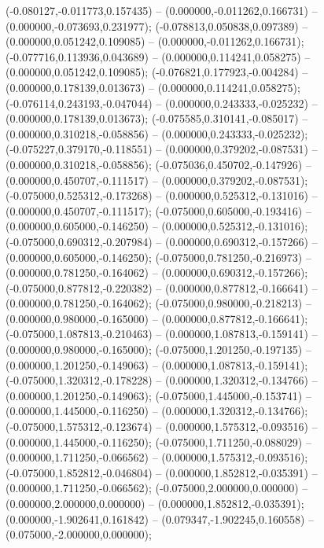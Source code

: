 (-0.080127,-0.011773,0.157435) -- (0.000000,-0.011262,0.166731) -- (0.000000,-0.073693,0.231977);
 (-0.078813,0.050838,0.097389) -- (0.000000,0.051242,0.109085) -- (0.000000,-0.011262,0.166731);
 (-0.077716,0.113936,0.043689) -- (0.000000,0.114241,0.058275) -- (0.000000,0.051242,0.109085);
 (-0.076821,0.177923,-0.004284) -- (0.000000,0.178139,0.013673) -- (0.000000,0.114241,0.058275);
 (-0.076114,0.243193,-0.047044) -- (0.000000,0.243333,-0.025232) -- (0.000000,0.178139,0.013673);
 (-0.075585,0.310141,-0.085017) -- (0.000000,0.310218,-0.058856) -- (0.000000,0.243333,-0.025232);
 (-0.075227,0.379170,-0.118551) -- (0.000000,0.379202,-0.087531) -- (0.000000,0.310218,-0.058856);
 (-0.075036,0.450702,-0.147926) -- (0.000000,0.450707,-0.111517) -- (0.000000,0.379202,-0.087531);
 (-0.075000,0.525312,-0.173268) -- (0.000000,0.525312,-0.131016) -- (0.000000,0.450707,-0.111517);
 (-0.075000,0.605000,-0.193416) -- (0.000000,0.605000,-0.146250) -- (0.000000,0.525312,-0.131016);
 (-0.075000,0.690312,-0.207984) -- (0.000000,0.690312,-0.157266) -- (0.000000,0.605000,-0.146250);
 (-0.075000,0.781250,-0.216973) -- (0.000000,0.781250,-0.164062) -- (0.000000,0.690312,-0.157266);
 (-0.075000,0.877812,-0.220382) -- (0.000000,0.877812,-0.166641) -- (0.000000,0.781250,-0.164062);
 (-0.075000,0.980000,-0.218213) -- (0.000000,0.980000,-0.165000) -- (0.000000,0.877812,-0.166641);
 (-0.075000,1.087813,-0.210463) -- (0.000000,1.087813,-0.159141) -- (0.000000,0.980000,-0.165000);
 (-0.075000,1.201250,-0.197135) -- (0.000000,1.201250,-0.149063) -- (0.000000,1.087813,-0.159141);
 (-0.075000,1.320312,-0.178228) -- (0.000000,1.320312,-0.134766) -- (0.000000,1.201250,-0.149063);
 (-0.075000,1.445000,-0.153741) -- (0.000000,1.445000,-0.116250) -- (0.000000,1.320312,-0.134766);
 (-0.075000,1.575312,-0.123674) -- (0.000000,1.575312,-0.093516) -- (0.000000,1.445000,-0.116250);
 (-0.075000,1.711250,-0.088029) -- (0.000000,1.711250,-0.066562) -- (0.000000,1.575312,-0.093516);
 (-0.075000,1.852812,-0.046804) -- (0.000000,1.852812,-0.035391) -- (0.000000,1.711250,-0.066562);
 (-0.075000,2.000000,0.000000) -- (0.000000,2.000000,0.000000) -- (0.000000,1.852812,-0.035391);
 (0.000000,-1.902641,0.161842) -- (0.079347,-1.902245,0.160558) -- (0.075000,-2.000000,0.000000);
